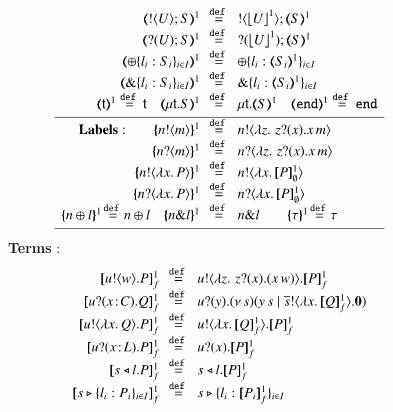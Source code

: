 \begin{figure}[t]
\[\begin{array}{rcll}
\tmap{\btout{U} S}{1} &\!\!\defeq\!\!& \btout{{\vtmap{U}{1}}} \tmap{S}{1}\\
\tmap{\btinp{U} S}{1} &\!\!\defeq\!\!& \btinp{{\vtmap{U}{1}}} \tmap{S}{1}\\
\tmap{\btsel{l_i: S_i}_{i \in I}}{1} &\!\!\defeq\!\!& \btsel{l_i: \tmap{S_i}{1}}_{i \in I}\\
		\tmap{\btbra{l_i: S_i}_{i \in I}}{1} &\!\!\defeq\!\!& \btbra{l_i: \tmap{S_i}{1}}_{i \in I}\\
\tmap{\vart{t}}{1} \defeq \vart{t} \quad 
		\tmap{\trec{t}{S}}{1}  &\!\!\defeq\!\!&
\trec{t}{\tmap{S}{1}}\quad 
\tmap{\tinact}{1}  \defeq  \tinact\\[1mm]
\hline
\noindent{\bf Labels:} \quad \quad 
	\mapa{\bactout{n}{m}}^{1} &\!\!\defeq\!\!&   \bactout{n}{\abs{z}{\,\binp{z}{x} \appl{x}{m}} } \\
	\mapa{\bactinp{n}{m}}^{1} &\!\!\defeq\!\!&   \bactinp{n}{\abs{z}{\,\binp{z}{x} \appl{x}{m}} } \\
		\mapa{\bactout{n}{\abs{{x}}{P}}}^{1} &\!\!\defeq\!\!& \bactout{n}{\abs{{x}}{\pmapp{P}{1}{\es}}}\\
		\mapa{\bactinp{n}{\abs{{x}}{P}}}^{1} &\!\!\defeq\!\!& \bactinp{n}{\abs{{x}}{\pmapp{P}{1}{\es}}}\\
		\mapa{\bactsel{n}{l} }^{1} \!\defeq\! \bactsel{n}{l} 
\quad 
		\mapa{\bactbra{n}{l} }^{1} &\!\!\defeq\!\!& \bactbra{n}{l} 
\quad \quad 
		\mapa{\tau}^{1} \!\defeq\! \tau
\\[1mm]
\hline
\end{array}
\]
{\bf Terms} : 
\[
\begin{array}{rcll}
  \pmapp{\bout{u}{w} P}{1}{f}	&\!\!\defeq\!\!&	\bout{u}{ \abs{z}{\,\binp{z}{x} (\appl{x}{w})} } \pmapp{P}{1}{f} \\
  \pmapp{\binp{u}{\AT{x}{C}} Q}{1}{f}	&\!\!\defeq\!\!&	\binp{u}{y} \newsp{s}{\appl{y}{s} \Par \bout{\dual{s}}{\abs{x}{\pmapp{Q}{1}{f}}} \inact} \\
		\pmapp{\bout{u}{\abs{{x}}{Q}} P}{1}{f}  
&\!\!\defeq\!\!& \bout{u}{\abs{{x}}{\pmapp{Q}{1}{f}}} \pmapp{P}{1}{f} \\
		\pmapp{\binp{u}{\AT{x}{L}} P}{1}{f} &\!\!\defeq\!\!& \binp{u}{x} \pmapp{P}{1}{f}\\
		\pmapp{\bsel{s}{l} P}{1}{f} &\!\!\defeq\!\!& \bsel{s}{l} \pmapp{P}{1}{f}\\
		\pmapp{\bbra{s}{l_i: P_i}_{i \in I}}{1}{f} &\!\!\defeq\!\!& \bbra{s}{l_i: \pmapp{P_i}{1}{f}}_{i \in I}\\

\end{array}\]
\end{figure}
